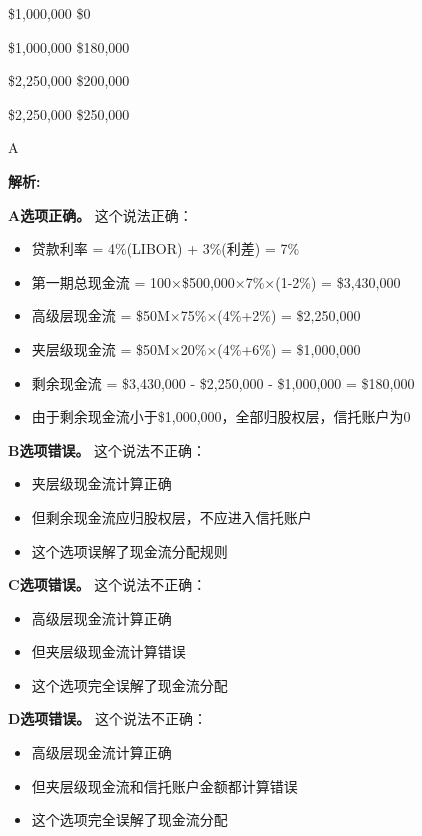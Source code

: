 \documentclass{article}
\newenvironment{explanation}
{\textbf{解析:}\par}
{\par}
\begin{document}
\begin{choices}
    \item \$1,000,000 \$0
    \item \$1,000,000 \$180,000
    \item \$2,250,000 \$200,000
    \item \$2,250,000 \$250,000
\end{choices}

\begin{correctanswer}
    A
\end{correctanswer}

\begin{explanation}
    \textbf{A选项正确。}
    这个说法正确：
    \begin{itemize}
        \item 贷款利率 = 4\%(LIBOR) + 3\%(利差) = 7\%
        \item 第一期总现金流 = 100×\$500,000×7\%×(1-2\%) = \$3,430,000
        \item 高级层现金流 = \$50M×75\%×(4\%+2\%) = \$2,250,000
        \item 夹层级现金流 = \$50M×20\%×(4\%+6\%) = \$1,000,000
        \item 剩余现金流 = \$3,430,000 - \$2,250,000 - \$1,000,000 = \$180,000
        \item 由于剩余现金流小于\$1,000,000，全部归股权层，信托账户为0
    \end{itemize}

    \textbf{B选项错误。}
    这个说法不正确：
    \begin{itemize}
        \item 夹层级现金流计算正确
        \item 但剩余现金流应归股权层，不应进入信托账户
        \item 这个选项误解了现金流分配规则
    \end{itemize}

    \textbf{C选项错误。}
    这个说法不正确：
    \begin{itemize}
        \item 高级层现金流计算正确
        \item 但夹层级现金流计算错误
        \item 这个选项完全误解了现金流分配
    \end{itemize}

    \textbf{D选项错误。}
    这个说法不正确：
    \begin{itemize}
        \item 高级层现金流计算正确
        \item 但夹层级现金流和信托账户金额都计算错误
        \item 这个选项完全误解了现金流分配
    \end{itemize}
\end{explanation}
\end{document}
